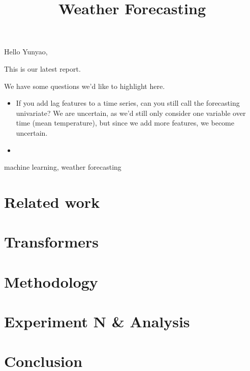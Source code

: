 


Hello Yunyao,

This is our latest report.

We have some questions we'd like to highlight here.

\begin{itemize}
    \item If you add lag features to a time series, can you still call the forecasting univariate? We are uncertain, as we'd still only consider one variable over time (mean temperature), but since we add more features, we become uncertain.
    \item {}
\end{itemize}

\newpage

\title{Weather Forecasting}
\author{
    \and
    \and
    \and
}

\maketitle

\begin{abstract}
\end{abstract}

\begin{IEEEkeywords}
machine learning, weather forecasting
\end{IEEEkeywords}




\section{Related work}



\section{Transformers}



\section{Methodology}

\section{Experiment N \& Analysis}

\section{Conclusion}





\appendix
%

